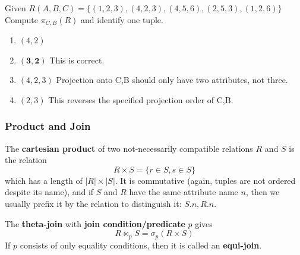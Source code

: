     \begin{example}
      Given $R(A,B,C) = \{(1,2,3), (4,2,3), (4,5,6), (2,5,3), (1,2,6)\}$\\
      Compute $\pi_{C,B}(R)$ and identify one tuple.

      \begin{enumerate}
        \item $(4,2)$ 
        \item $\mathbf{(3,2)}$ This is correct. 
        \item $(4,2,3)$ Projection onto C,B should only have two attributes, not three.
        \item $(2,3)$ This reverses the specified projection order of C,B.
      \end{enumerate}
    \end{example}

  \subsubsection{Product and Join}

    \begin{definition}
      The \textbf{cartesian product} of two not-necessarily compatible relations $R$ and $S$ is the relation 
      \begin{equation}
        R \times S = \{r \in S, s \in S\} 
      \end{equation}
      which has a length of $|R| \times |S|$. It is commutative (again, tuples are not ordered despite its name), and if $S$ and $R$ have the same attribute name $n$, then we usually prefix it by the relation to distinguish it: $S.n, R.n$. 
    \end{definition}

    \begin{definition}
      The \textbf{theta-join} with \textbf{join condition/predicate} $p$ gives 
      \begin{equation}
        R \bowtie_p S = \sigma_p (R \times S)
      \end{equation}
      If $p$ consists of only equality conditions, then it is called an \textbf{equi-join}. 
    \end{definition}

